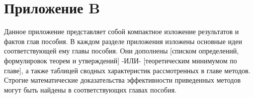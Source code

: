 

\newpage
{}
\pagestyle{empty}
\chapter*{Приложение B}
\vspace{0.5cm}

Данное приложение представляет собой компактное изложение результатов и фактов глав пособия. В каждом разделе приложения изложены основные идеи соответствующей ему главы пособия. Они дополнены [списком определений, формулировок теорем и утверждений] -ИЛИ- [теоретическим минимумом по главе], а также таблицей сводных характеристик рассмотренных в главе методов. Строгие математические доказательства эффективности приведенных методов могут быть найдены в соответствующих главах пособия.






